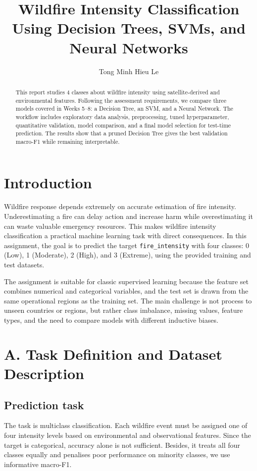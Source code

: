 \documentclass[11pt,a4paper]{article}
\title{Wildfire Intensity Classification Using Decision Trees, SVMs, and Neural Networks}
\author{Tong Minh Hieu Le}
\begin{document}
\maketitle

\begin{abstract}
This report studies 4 classes about wildfire intensity using satellite-derived and environmental features. Following the assessment requirements, we compare three models covered in Weeks 5--8: a Decision Tree, an SVM, and a Neural Network. The workflow includes exploratory data analysis, preprocessing, tuned hyperparameter, quantitative validation, model comparison, and a final model selection for test-time prediction. The results show that a pruned Decision Tree gives the best validation macro-F1 while remaining interpretable.
\end{abstract}

\section{Introduction}
Wildfire response depends extremely on accurate estimation of fire intensity. Underestimating a fire can delay action and increase harm while overestimating it can waste valuable emergency resources. This makes wildfire intensity classification a practical machine learning task with direct consequences. In this assignment, the goal is to predict the target \texttt{fire\_intensity} with four classes: 0 (Low), 1 (Moderate), 2 (High), and 3 (Extreme), using the provided training and test datasets.

The assignment is suitable for classic supervised learning because the feature set combines numerical and categorical variables, and the test set is drawn from the same operational regions as the training set. The main challenge is not process to unseen countries or regions, but rather class imbalance, missing values, feature types, and the need to compare models with different inductive biases.

\section{A. Task Definition and Dataset Description}
\subsection{Prediction task}
The task is multiclass classification. Each wildfire event must be assigned one of four intensity levels based on environmental and observational features. Since the target is categorical, accuracy alone is not sufficient. Besides, it treats all four classes equally and penalises poor performance on minority classes, we use informative macro-F1.
\end{document}
